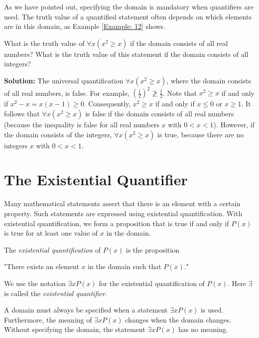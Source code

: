 \documentclass{Axon}
\begin{document}
As we have pointed out, specifying the domain is mandatory when quantifiers are used. The truth value of a quantified statement often depends on which elements are in this domain, as Example \ref{Example: 12} shows.

\begin{example}\label{Example: 12}
    What is the truth value of \(\forall x (x^2 \ge x)\) if the domain consists of all real numbers? What is the truth value of this statement if the domain consists of all integers?

    \noindent
    \textbf{Solution:}
    The universal quantification \(\forall x(x^2 \ge x)\), where the domain consists of all real numbers, is false. For example, \(\left(\frac{1}{2}\right)^2 \not\ge \frac{1}{2}\). Note that \(x^2 \ge x\) if and only if \(x^2 - x = x(x - 1) \ge 0\). Consequently, \(x^2 \ge x\) if and only if \(x \le 0\) or \(x \ge 1\). It follows that \(\forall x (x^2 \geq x)\) is false if the domain consists of all real numbers (because the inequality is false for all real numbers \(x\) with \(0 < x < 1\)). However, if the domain consists of the integers, \(\forall x(x^2 \ge x)\) is true, because there are no integers \(x\) with \(0 < x < 1\).
\end{example}

\section{The Existential Quantifier}
Many mathematical statements assert that there is an element with a certain property. Such statements are expressed using existential quantification. With existential quantification, we form a proposition that is true if and only if \(P(x)\) is true for at least one value of \(x\) in the domain.

\begin{definition}
    The \textit{existential quantification} of \(P(x)\) is the proposition
    \begin{center}
        "There exists an element \(x\) in the domain such that \(P(x)\)."
    \end{center}
    We use the notation \(\exists x P(x)\) for the existential quantification of \(P(x)\). Here \(\exists\) is called the \textit{existential quantifier}.
\end{definition}

A domain must always be specified when a statement \(\exists x P(x)\) is used. Furthermore, the meaning of \(\exists x P(x)\) changes when the domain changes. Without specifying the domain, the statement \(\exists x P(x)\) has no meaning.
\end{document}
